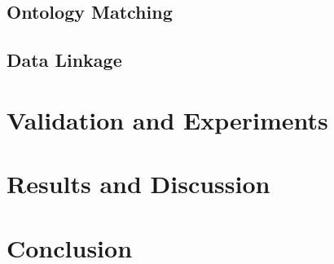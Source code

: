 \documentclass[runningheads,a4paper]{StyleFiles/llncs}
\begin{document}
\subsection{Ontology Matching}
\subsection{Data Linkage}

\section{Validation and Experiments}

\section{Results and Discussion}


\section{Conclusion}



\end{document}
